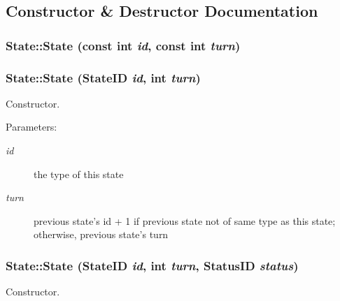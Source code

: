 \subsection{Constructor \& Destructor Documentation}
\hypertarget{classState_1b4e314c21378ef15c4ef854d4c88001}{
\subsubsection[{State}]{\setlength{\rightskip}{0pt plus 5cm}State::State (const int {\em id}, \/  const int {\em turn})}}
\label{classState_1b4e314c21378ef15c4ef854d4c88001}


\hypertarget{classState_efadc9ab55d44f059e139b65c759dc14}{
\subsubsection[{State}]{\setlength{\rightskip}{0pt plus 5cm}State::State ({\bf StateID} {\em id}, \/  int {\em turn})}}
\label{classState_efadc9ab55d44f059e139b65c759dc14}


Constructor. 

\begin{Desc}
\item[Parameters:]
\begin{description}
\item[{\em id}]the type of this state \item[{\em turn}]previous state's id + 1 if previous state not of same type as this state; otherwise, previous state's turn \end{description}
\end{Desc}
\hypertarget{classState_0bfcbd427c3d009f71c627516ec17b25}{
\subsubsection[{State}]{\setlength{\rightskip}{0pt plus 5cm}State::State ({\bf StateID} {\em id}, \/  int {\em turn}, \/  {\bf StatusID} {\em status})}}
\label{classState_0bfcbd427c3d009f71c627516ec17b25}


Constructor. 

